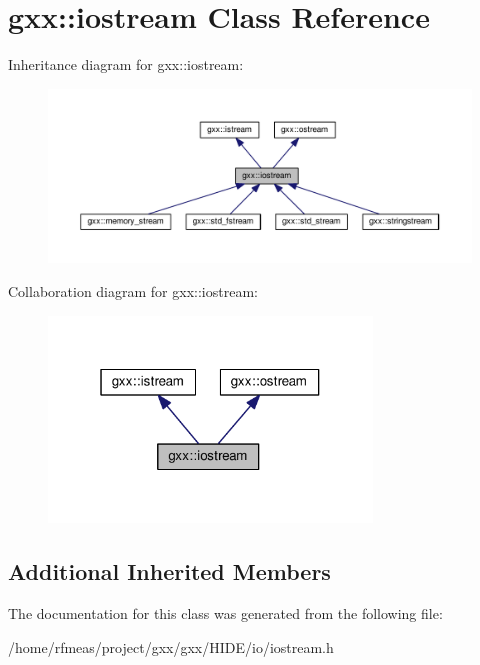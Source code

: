\hypertarget{classgxx_1_1iostream}{}\section{gxx\+:\+:iostream Class Reference}
\label{classgxx_1_1iostream}


Inheritance diagram for gxx\+:\+:iostream\+:
\nopagebreak
\begin{figure}[H]
\begin{center}
\leavevmode
\includegraphics[width=350pt]{classgxx_1_1iostream__inherit__graph}
\end{center}
\end{figure}


Collaboration diagram for gxx\+:\+:iostream\+:
\nopagebreak
\begin{figure}[H]
\begin{center}
\leavevmode
\includegraphics[width=244pt]{classgxx_1_1iostream__coll__graph}
\end{center}
\end{figure}
\subsection*{Additional Inherited Members}


The documentation for this class was generated from the following file\+:\begin{DoxyCompactItemize}
\item 
/home/rfmeas/project/gxx/gxx/\+H\+I\+D\+E/io/iostream.\+h\end{DoxyCompactItemize}
